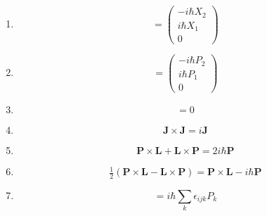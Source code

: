 \begin{enumerate}

\item
\begin{equation*}
[\mathbf X,L_3]
=\begin{pmatrix}
-i\hbar X_2
\\
i\hbar X_1
\\
0
\end{pmatrix}
\end{equation*}

\item
\begin{equation*}
[\mathbf P,L_3]
=\begin{pmatrix}
-i\hbar P_2
\\
i\hbar P_1
\\
0
\end{pmatrix}
\end{equation*}

\item
\begin{equation*}
[\mathbf L,L^2]=0
\end{equation*}

\item
\begin{equation*}
\mathbf J\times\mathbf J=i\mathbf J
\end{equation*}

\item
\begin{equation*}
\mathbf P\times\mathbf L+\mathbf L\times\mathbf P=2i\hbar\mathbf P
\end{equation*}

\item
\begin{equation*}
\tfrac{1}{2}\left(\mathbf P\times\mathbf L-\mathbf L\times\mathbf P\right)
=\mathbf P\times\mathbf L-i\hbar\mathbf P
\end{equation*}

\item
\begin{equation*}
[L_i,P_j]=i\hbar\sum_k\epsilon_{ijk}P_k
\end{equation*}

\end{enumerate}



